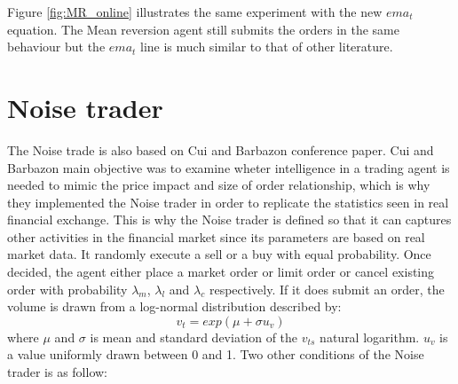 Figure \ref{fig:MR_online} illustrates the same experiment with the new $ema_t$ equation. The Mean reversion agent still submits the orders in the same behaviour but the $ema_t$ line is much similar to that of other literature. 

\section{Noise trader} 
The Noise trade is also based on Cui and Barbazon \cite{CuiNoise} conference paper. Cui and Barbazon main objective was to examine wheter intelligence in a trading agent is needed to mimic the price impact and size of order relationship, which is why they implemented the Noise trader in order to replicate the statistics seen in real financial exchange. This is why the  Noise trader is defined so that it can captures other activities in the financial market since its parameters are based on real market data. It randomly execute a sell or a buy with equal probability. Once decided, the agent either place a market order or limit order or cancel existing order with probability $\lambda_{m}$, $\lambda_{l}$ and $\lambda_{c}$ respectively. If it does submit an order, the volume is drawn from a log-normal distribution described by:
\begin{equation}
v_t = exp(\mu + \sigma u_v) 
\end{equation}
where $\mu$ and $\sigma$ is mean and standard deviation of the $v_{ts}$ natural logarithm. $u_v$ is a value uniformly drawn between 0 and 1. Two other conditions of the Noise trader is as follow: 

